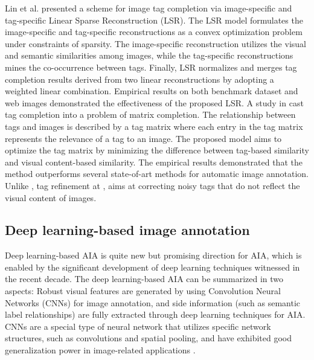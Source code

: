 \documentclass[conference]{IEEEtran}
\begin{document}
		Lin et al.\cite{LSR} presented a scheme for image tag completion via image-specific and tag-specific Linear Sparse Reconstruction (LSR). The LSR model formulates the image-specific
and tag-specific reconstructions as a convex optimization problem under constraints of
sparsity. The image-specific reconstruction utilizes the visual and semantic similarities
among images, while the tag-specific reconstructions mines the co-occurrence between
tags. Finally, LSR normalizes and merges tag completion results derived from two linear
reconstructions by adopting a weighted linear combination. Empirical results on both
benchmark dataset and web images demonstrated the effectiveness of the proposed LSR.
A study in\cite{TCFIR} cast tag completion into a problem of matrix completion. The
relationship between tags and images is described by a tag matrix where each entry in
the tag matrix represents the relevance of a tag to an image. The proposed model aims to
optimize the tag matrix by minimizing the difference between tag-based similarity and visual
content-based similarity. The empirical results demonstrated that the method outperforms
		several state-of-art methods for automatic image annotation. Unlike \cite{TCFIR}, tag refinement at \cite{ITCR}, aims at correcting noisy tags that do not reflect the visual content of images.



	\subsection{Deep learning-based image annotation}

		Deep learning-based AIA is quite new but promising direction for AIA, which is enabled by the significant development of deep learning techniques witnessed in the recent decade. The deep learning-based AIA can be summarized in two aspects: Robust visual features are
generated by using Convolution Neural Networks (CNNs) for image annotation, and side information (such as semantic label relationships) are fully extracted through deep learning techniques for AIA. CNNs are a special type of neural network that utilizes specific network structures, such as convolutions and spatial pooling, and have exhibited good generalization power in image-related applications \cite{Shin, Simonyan, Kalita}.\\
		
\end{document}
